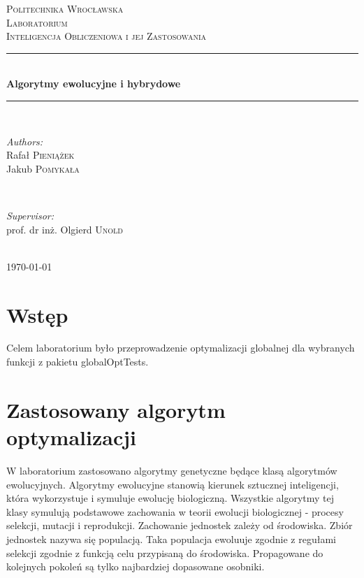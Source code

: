 \documentclass{article}
\begin{document}
	
	\begin{titlepage}
		\center
		\newcommand{\HRule}{\rule{\linewidth}{0.6mm}}
		
		\textsc{\LARGE Politechnika Wrocławska}\\[1.5cm]
		\textsc{\Large Laboratorium}\\[0.5cm] 
		\textsc{\large Inteligencja Obliczeniowa i jej Zastosowania}\\[0.7cm] 

		\HRule \\[0.4cm]
		{ \huge \bfseries Algorytmy ewolucyjne i hybrydowe}\\[0.4cm]
		\HRule \\[1.5cm]
		
		\begin{minipage}{0.4\textwidth}
			\begin{flushleft} \large
				\emph{Authors:}\\
				Rafał \textsc{Pieniążek}\\
                Jakub \textsc{Pomykała}
			\end{flushleft}
		\end{minipage}
		~
		\begin{minipage}{0.4\textwidth}
			\begin{flushright} \large
				\emph{Supervisor:} \\
				prof. dr inż. Olgierd \textsc{Unold} 
			\end{flushright}
		\end{minipage}\\[4cm]

		{\large \today}\\[3cm]
		
		\vfill
		
	\end{titlepage}
\tableofcontents
\newpage
\listoffigures
\newpage
\section{Wstęp}
	Celem laboratorium było przeprowadzenie optymalizacji globalnej dla wybranych funkcji z pakietu globalOptTests.
    

\section{Zastosowany algorytm optymalizacji}

W laboratorium zastosowano algorytmy genetyczne będące klasą algorytmów ewolucyjnych.
Algorytmy ewolucyjne stanowią kierunek sztucznej inteligencji, która wykorzystuje i symuluje ewolucję biologiczną. Wszystkie algorytmy tej klasy symulują podstawowe zachowania w teorii ewolucji biologicznej - procesy selekcji, mutacji i reprodukcji. Zachowanie jednostek zależy od środowiska. Zbiór jednostek nazywa się populacją. Taka populacja ewoluuje zgodnie z regułami selekcji zgodnie z funkcją celu przypisaną do środowiska. Propagowane do kolejnych pokoleń są tylko najbardziej dopasowane osobniki.
\end{document}
